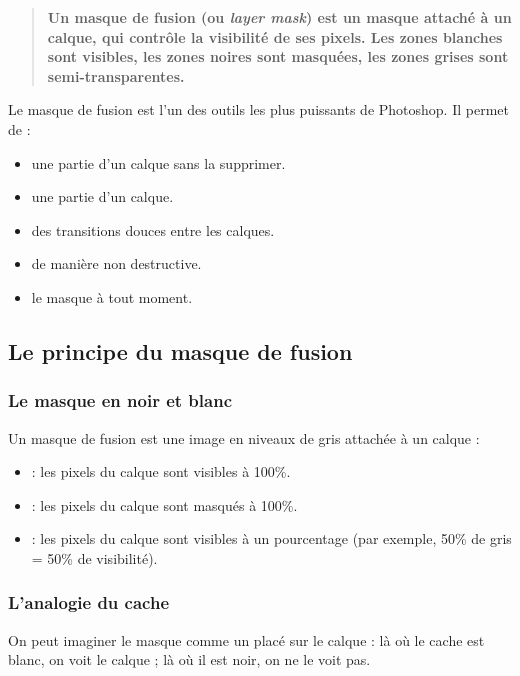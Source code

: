 \begin{quote}
\textbf{Un masque de fusion (ou \emph{layer mask}) est un masque attaché à un calque, qui contrôle la visibilité de ses pixels. Les zones blanches sont visibles, les zones noires sont masquées, les zones grises sont semi-transparentes.}
\end{quote}

Le masque de fusion est l'un des outils les plus puissants de Photoshop. Il permet de :

\begin{itemize}
    \item {} une partie d'un calque sans la supprimer.
    \item {} une partie d'un calque.
    \item {} des transitions douces entre les calques.
    \item {} de manière non destructive.
    \item {} le masque à tout moment.
\end{itemize}

\subsection{Le principe du masque de fusion}

\subsubsection{Le masque en noir et blanc}

Un masque de fusion est une image en niveaux de gris attachée à un calque :

\begin{itemize}
    \item {} : les pixels du calque sont visibles à 100\%.
    \item {} : les pixels du calque sont masqués à 100\%.
    \item {} : les pixels du calque sont visibles à un pourcentage (par exemple, 50\% de gris = 50\% de visibilité).
\end{itemize}

\subsubsection{L'analogie du cache}

On peut imaginer le masque comme un  placé sur le calque : là où le cache est blanc, on voit le calque ; là où il est noir, on ne le voit pas.

